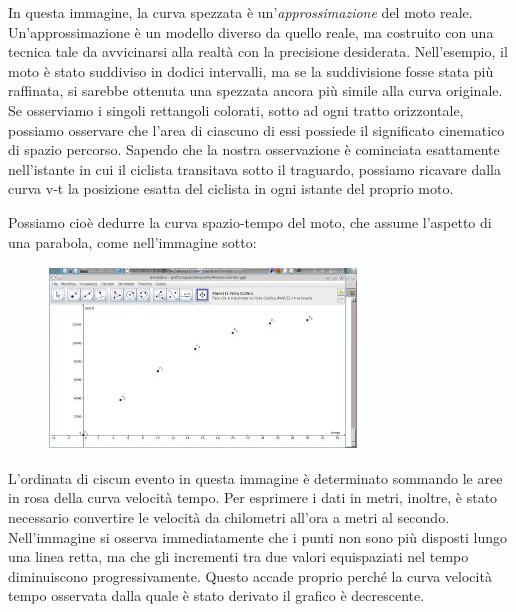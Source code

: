 In questa immagine, la curva spezzata è un’{\slshape approssimazione} del moto reale. Un’approssimazione è un modello diverso da quello reale, ma costruito con una tecnica tale da avvicinarsi alla realtà con la precisione desiderata. Nell’esempio, il moto è stato suddiviso in dodici intervalli, ma se la suddivisione fosse stata più raffinata, si sarebbe ottenuta una spezzata ancora più simile alla curva originale.\newline
Se osserviamo i singoli rettangoli colorati, sotto ad ogni tratto orizzontale, possiamo osservare che l’area di ciascuno di essi possiede il significato cinematico di spazio percorso. Sapendo che la nostra osservazione è cominciata esattamente nell’istante in cui il ciclista transitava sotto il traguardo, possiamo ricavare dalla curva v-t la posizione esatta del ciclista in ogni istante del proprio moto.\newline

Possiamo cioè dedurre la curva spazio-tempo del moto, che assume l’aspetto di una parabola, come nell’immagine sotto:

\begin{figure}[H]
 \centering
 \includegraphics[width=.7\textwidth]{../immagini/curvaSpazioTempo.jpeg}
\end{figure}


L'ordinata di ciscun evento in questa immagine è determinato sommando le aree in rosa della curva velocità tempo. Per esprimere i dati in metri, inoltre, è stato necessario convertire le velocità da chilometri all’ora a metri al secondo.
Nell’immagine si osserva immediatamente che i punti non sono più disposti lungo una linea retta, ma che gli incrementi tra due valori equispaziati nel tempo diminuiscono progressivamente. Questo accade proprio perché la curva velocità tempo osservata dalla quale è stato derivato il grafico è decrescente.\newline

